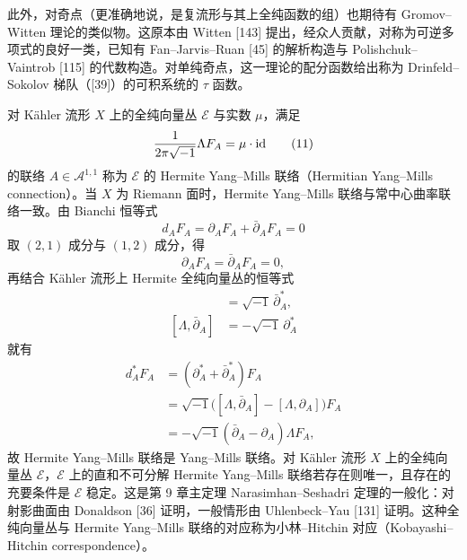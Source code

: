 此外，对奇点（更准确地说，是复流形与其上全纯函数的组）也期待有 Gromov–Witten 理论的类似物。这原本由 Witten [143] 提出，经众人贡献，对称为可逆多项式的良好一类，已知有 Fan–Jarvis–Ruan [45] 的解析构造与 Polishchuk–Vaintrob [115] 的代数构造。对单纯奇点，这一理论的配分函数给出称为 Drinfeld–Sokolov 梯队（[39]）的可积系统的 $\tau$ 函数。

对 Kähler 流形 $X$ 上的全纯向量丛 $\mathcal{E}$ 与实数 $\mu$，满足
\begin{equation*}
\frac{1}{2\pi\sqrt{-1}}\Lambda F_A=\mu\cdot\mathrm{id}
\tag{11}
\end{equation*}
的联络 $A\in\mathcal{A}^{1,1}$ 称为 $\mathcal{E}$ 的 Hermite Yang–Mills 联络（Hermitian Yang–Mills connection）。当 $X$ 为 Riemann 面时，Hermite Yang–Mills 联络与常中心曲率联络一致。由 Bianchi 恒等式
\begin{equation*}
d_AF_A=\partial_AF_A+\bar\partial_AF_A=0
\tag{12}
\end{equation*}
取 $(2,1)$ 成分与 $(1,2)$ 成分，得
\begin{equation*}
\partial_AF_A=\bar\partial_AF_A=0,
\tag{13}
\end{equation*}
再结合 Kähler 流形上 Hermite 全纯向量丛的恒等式
\begin{align*}
[\Lambda,\partial_A]&=\sqrt{-1}\,\bar\partial_A^*, \tag{14}\\
[\Lambda,\bar\partial_A]&=-\sqrt{-1}\,\partial_A^* \tag{15}
\end{align*}
就有
\begin{align*}
d_A^*F_A&=(\partial_A^*+\bar\partial_A^*)F_A \tag{16}\\
&=\sqrt{-1}\bigl([\Lambda,\bar\partial_A]-[\Lambda,\partial_A]\bigr)F_A \tag{17}\\
&=-\sqrt{-1}(\bar\partial_A-\partial_A)\Lambda F_A, \tag{18}
\end{align*}
故 Hermite Yang–Mills 联络是 Yang–Mills 联络。对 Kähler 流形 $X$ 上的全纯向量丛 $\mathcal{E}$，$\mathcal{E}$ 上的直和不可分解 Hermite Yang–Mills 联络若存在则唯一，且存在的充要条件是 $\mathcal{E}$ 稳定。这是第 9 章主定理 Narasimhan–Seshadri 定理的一般化：对射影曲面由 Donaldson [36] 证明，一般情形由 Uhlenbeck–Yau [131] 证明。这种全纯向量丛与 Hermite Yang–Mills 联络的对应称为小林–Hitchin 对应（Kobayashi–Hitchin correspondence）。

